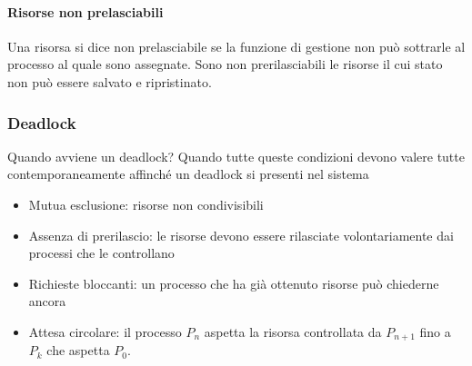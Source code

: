 \documentclass[a4paper,12pt]{article}
\begin{document}
\paragraph{Risorse non prelasciabili}
Una risorsa si dice non prelasciabile se la funzione di gestione non può sottrarle al processo al quale sono assegnate. Sono non prerilasciabili le risorse il cui stato non può essere salvato e ripristinato.
\subsubsection{Deadlock}
Quando avviene un deadlock? Quando tutte queste condizioni devono valere tutte contemporaneamente affinché un deadlock si presenti nel sistema
\begin{itemize}
  \item Mutua esclusione: risorse non condivisibili
  \item Assenza di prerilascio: le risorse devono essere rilasciate volontariamente dai processi che le controllano
  \item Richieste bloccanti: un processo che ha già ottenuto risorse può chiederne ancora
  \item Attesa circolare: il processo $P_n$ aspetta la risorsa controllata da $P_{n+1}$ fino a $P_k$ che aspetta $P_0$.
\end{itemize}
\end{document}
